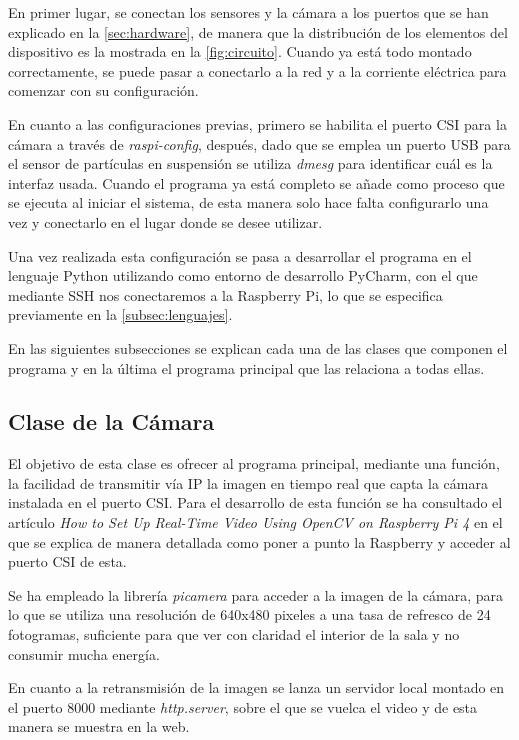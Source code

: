 En primer lugar, se conectan los sensores y la cámara a los puertos que se han explicado en la \autoref{sec:hardware}, de manera que la distribución de los elementos del dispositivo es la mostrada en la \autoref{fig:circuito}. Cuando ya está todo montado correctamente, se puede pasar a conectarlo a la red y a la corriente eléctrica para comenzar con su configuración.

En cuanto a las configuraciones previas, primero se habilita el puerto CSI para la cámara a través de \textit{raspi-config}, después, dado que se emplea un puerto USB para el sensor de partículas en suspensión se utiliza \textit{dmesg} para identificar cuál es la interfaz usada. Cuando el programa ya está completo se añade como proceso que se ejecuta al iniciar el sistema, de esta manera solo hace falta configurarlo una vez y conectarlo en el lugar donde se desee utilizar.
\pagebreak

Una vez realizada esta configuración se pasa a desarrollar el programa en el lenguaje Python utilizando como entorno de desarrollo PyCharm, con el que mediante SSH nos conectaremos a la Raspberry Pi, lo que se especifica previamente en la \autoref{subsec:lenguajes}.

En las siguientes subsecciones se explican cada una de las clases que componen el programa y en la última el programa principal que las relaciona a todas ellas.

\subsection{Clase de la Cámara}
El objetivo de esta clase es ofrecer al programa principal, mediante una función, la facilidad de transmitir vía IP la imagen en tiempo real que capta la cámara instalada en el puerto CSI. Para el desarrollo de esta función se ha consultado el artículo \textit{How to Set Up Real-Time Video Using OpenCV on Raspberry Pi 4} \cite{noauthor_how_nodate} en el que se explica de manera detallada como poner a punto la Raspberry y acceder al puerto CSI de esta.

Se ha empleado la librería \textit{picamera} \cite{noauthor_picamera_nodate} para acceder a la imagen de la cámara, para lo que se utiliza una resolución de 640x480 pixeles a una tasa de refresco de 24 fotogramas, suficiente para que ver con claridad el interior de la sala y no consumir mucha energía. 

En cuanto a la retransmisión de la imagen se lanza un servidor local montado en el puerto 8000 mediante \textit{http.server}, sobre el que se vuelca el video y de esta manera se muestra en la web.

